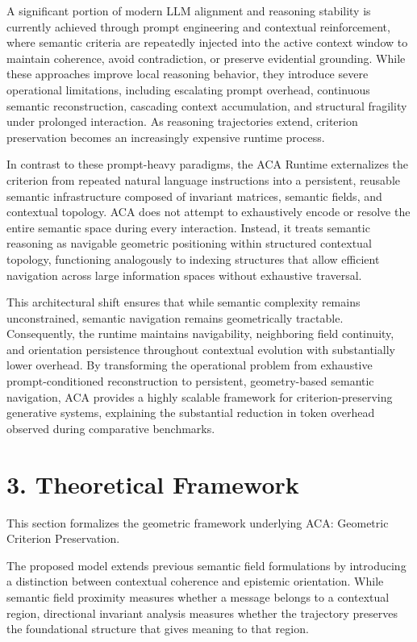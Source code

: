 \documentclass[11pt]{article}
\begin{document}
A significant portion of modern LLM alignment and reasoning stability is currently achieved through prompt engineering and contextual reinforcement, where semantic criteria are repeatedly injected into the active context window to maintain coherence, avoid contradiction, or preserve evidential grounding. While these approaches improve local reasoning behavior, they introduce severe operational limitations, including escalating prompt overhead, continuous semantic reconstruction, cascading context accumulation, and structural fragility under prolonged interaction. As reasoning trajectories extend, criterion preservation becomes an increasingly expensive runtime process.

In contrast to these prompt-heavy paradigms, the ACA Runtime externalizes the criterion from repeated natural language instructions into a persistent, reusable semantic infrastructure composed of invariant matrices, semantic fields, and contextual topology. ACA does not attempt to exhaustively encode or resolve the entire semantic space during every interaction. Instead, it treats semantic reasoning as navigable geometric positioning within structured contextual topology, functioning analogously to indexing structures that allow efficient navigation across large information spaces without exhaustive traversal.

This architectural shift ensures that while semantic complexity remains unconstrained, semantic navigation remains geometrically tractable. Consequently, the runtime maintains navigability, neighboring field continuity, and orientation persistence throughout contextual evolution with substantially lower overhead. By transforming the operational problem from exhaustive prompt-conditioned reconstruction to persistent, geometry-based semantic navigation, ACA provides a highly scalable framework for criterion-preserving generative systems, explaining the substantial reduction in token overhead observed during comparative benchmarks.

\section{3. Theoretical Framework}

This section formalizes the geometric framework underlying ACA: Geometric Criterion Preservation.

The proposed model extends previous semantic field formulations by introducing a distinction between contextual coherence and epistemic orientation. While semantic field proximity measures whether a message belongs to a contextual region, directional invariant analysis measures whether the trajectory preserves the foundational structure that gives meaning to that region.
\end{document}
